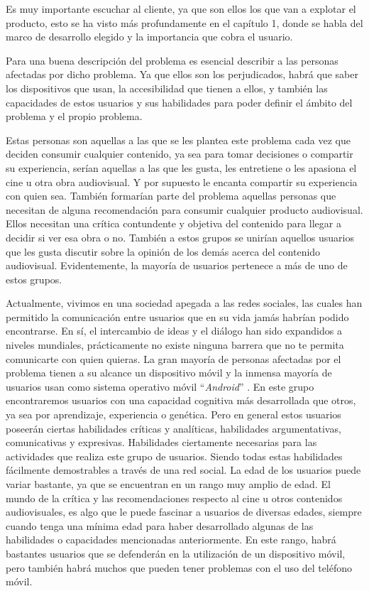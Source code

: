 Es muy importante escuchar al cliente, ya que son ellos los que van a explotar el producto, esto se 
ha visto más profundamente en el capítulo 1, donde se habla del marco de desarrollo elegido y la importancia 
que cobra el usuario.

Para una buena descripción del problema es esencial describir a las personas afectadas por dicho 
problema. Ya que ellos son los perjudicados, habrá que saber los dispositivos que usan, la 
accesibilidad que tienen a ellos, y también las capacidades de estos usuarios y sus habilidades para 
poder definir el ámbito del problema y el propio problema.

Estas personas son aquellas a las que se les plantea este problema cada vez que deciden consumir cualquier
contenido, ya sea para tomar decisiones o compartir su experiencia, serían aquellas a las que les 
gusta, les entretiene o les apasiona el cine u otra obra audiovisual. Y por supuesto le encanta 
compartir su experiencia con quien sea. También formarían parte del problema aquellas personas que 
necesitan de alguna recomendación para consumir cualquier producto audiovisual. Ellos necesitan una 
crítica contundente y objetiva del contenido para llegar a decidir si ver esa obra o no. También a 
estos grupos se unirían aquellos usuarios que les gusta discutir sobre la opinión de los demás acerca 
del contenido audiovisual. Evidentemente, la mayoría de usuarios pertenece a más de uno de estos grupos.

Actualmente, vivimos en una sociedad apegada a las redes sociales, las cuales han permitido la 
comunicación entre usuarios que en su vida jamás habrían podido encontrarse. En sí, el intercambio de 
ideas y el diálogo han sido expandidos a niveles mundiales, prácticamente no existe ninguna barrera
que no te permita comunicarte con quien quieras. La gran mayoría de personas afectadas por el problema 
tienen a su alcance un dispositivo móvil y la inmensa mayoría de usuarios usan como sistema operativo 
móvil ``\textit{Android}'' \cite{OSmobile}\cite{AndrvsIOS}. En este grupo encontraremos usuarios con 
una capacidad cognitiva más desarrollada que otros, ya sea por aprendizaje, experiencia o genética. 
Pero en general estos usuarios poseerán ciertas habilidades críticas y analíticas, habilidades 
argumentativas, comunicativas y expresivas. Habilidades ciertamente necesarias para las actividades que 
realiza este grupo de usuarios. Siendo todas estas habilidades fácilmente demostrables a través de  una 
red social. La edad de los usuarios puede variar bastante, ya que se encuentran en un rango muy amplio 
de edad. El mundo de la crítica y las recomendaciones respecto al cine u otros contenidos 
audiovisuales, es algo que le puede fascinar a usuarios de diversas edades, siempre cuando tenga una 
mínima edad para haber desarrollado algunas de las habilidades o capacidades mencionadas anteriormente. 
En este rango, habrá bastantes usuarios que se defenderán en la utilización de un dispositivo móvil, pero 
también habrá muchos que pueden tener problemas con el uso del teléfono móvil.

